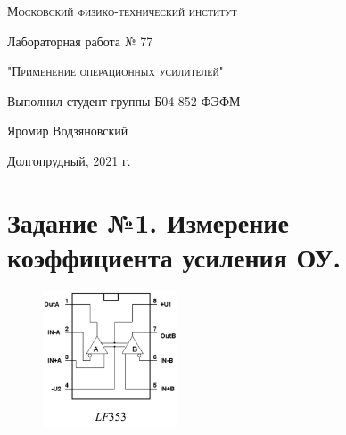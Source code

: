 \documentclass[a4paper]{article}
\begin{document}
\begin{titlepage}
	\centering
	\vspace{5cm}
	{\scshape\LARGE Московский физико-технический институт \par}
	\vspace{5cm}

	{\huge Лабораторная работа № 77 \par}
	\vspace{1cm}
	{\scshape\Large "Применение операционных усилителей"\par}
	\vspace{2cm}
	\vfill
\begin{flushright}
	{\Large Выполнил студент группы Б04-852 ФЭФМ}\par
	\vspace{0.3cm}
	{\LARGE Яромир Водзяновский } \par

	
\end{flushright}
	

	\vfill\large

	Долгопрудный, 2021 г.
\end{titlepage}


\pagestyle{fancy} 
\fancyfoot[C]{ \noindent\rule{\textwidth}{0.4pt} \thepage }

\section{Задание №1. Измерение коэффициента усиления ОУ.}


 \begin{figure}[H]
        \begin{center}
        \includegraphics[width=4cm]{lf353.png}
        \label{real} %
        \end{center}
    \end{figure}
\end{document}
